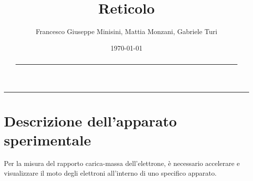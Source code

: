 \documentclass[a4paper,12pt]{article}
\title{Reticolo}
\author{Francesco Giuseppe Minisini, Mattia Monzani, Gabriele Turi}
\date{\today}
\begin{document}
\maketitle
\hrule
\vspace{9pt}
\begin{abstract}
    \noindent
    
\vspace{20pt}
\hrule
\end{abstract}
\vspace{2 pt}


\section{Descrizione dell’apparato sperimentale}
Per la misura del rapporto carica-massa dell’elettrone, è necessario accelerare e visualizzare il moto degli elettroni all’interno di uno specifico apparato. 
\end{document}
